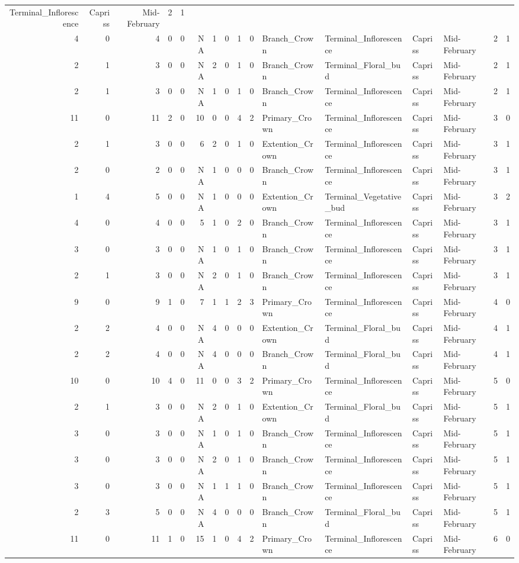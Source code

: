 \documentclass[]{article}
\begin{document}
\begin{longtable}[]{@{}rrrrrrrrrrllllrl@{}}
Terminal\_Inflorescence & Capriss & Mid-February & 2 & 1\tabularnewline
4 & 0 & 4 & 0 & 0 & NA & 1 & 0 & 1 & 0 & Branch\_Crown &
Terminal\_Inflorescence & Capriss & Mid-February & 2 & 1\tabularnewline
2 & 1 & 3 & 0 & 0 & NA & 2 & 0 & 1 & 0 & Branch\_Crown &
Terminal\_Floral\_bud & Capriss & Mid-February & 2 & 1\tabularnewline
2 & 1 & 3 & 0 & 0 & NA & 1 & 0 & 1 & 0 & Branch\_Crown &
Terminal\_Inflorescence & Capriss & Mid-February & 2 & 1\tabularnewline
11 & 0 & 11 & 2 & 0 & 10 & 0 & 0 & 4 & 2 & Primary\_Crown &
Terminal\_Inflorescence & Capriss & Mid-February & 3 & 0\tabularnewline
2 & 1 & 3 & 0 & 0 & 6 & 2 & 0 & 1 & 0 & Extention\_Crown &
Terminal\_Inflorescence & Capriss & Mid-February & 3 & 1\tabularnewline
2 & 0 & 2 & 0 & 0 & NA & 1 & 0 & 0 & 0 & Branch\_Crown &
Terminal\_Inflorescence & Capriss & Mid-February & 3 & 1\tabularnewline
1 & 4 & 5 & 0 & 0 & NA & 1 & 0 & 0 & 0 & Extention\_Crown &
Terminal\_Vegetative\_bud & Capriss & Mid-February & 3 &
2\tabularnewline
4 & 0 & 4 & 0 & 0 & 5 & 1 & 0 & 2 & 0 & Branch\_Crown &
Terminal\_Inflorescence & Capriss & Mid-February & 3 & 1\tabularnewline
3 & 0 & 3 & 0 & 0 & NA & 1 & 0 & 1 & 0 & Branch\_Crown &
Terminal\_Inflorescence & Capriss & Mid-February & 3 & 1\tabularnewline
2 & 1 & 3 & 0 & 0 & NA & 2 & 0 & 1 & 0 & Branch\_Crown &
Terminal\_Inflorescence & Capriss & Mid-February & 3 & 1\tabularnewline
9 & 0 & 9 & 1 & 0 & 7 & 1 & 1 & 2 & 3 & Primary\_Crown &
Terminal\_Inflorescence & Capriss & Mid-February & 4 & 0\tabularnewline
2 & 2 & 4 & 0 & 0 & NA & 4 & 0 & 0 & 0 & Extention\_Crown &
Terminal\_Floral\_bud & Capriss & Mid-February & 4 & 1\tabularnewline
2 & 2 & 4 & 0 & 0 & NA & 4 & 0 & 0 & 0 & Branch\_Crown &
Terminal\_Floral\_bud & Capriss & Mid-February & 4 & 1\tabularnewline
10 & 0 & 10 & 4 & 0 & 11 & 0 & 0 & 3 & 2 & Primary\_Crown &
Terminal\_Inflorescence & Capriss & Mid-February & 5 & 0\tabularnewline
2 & 1 & 3 & 0 & 0 & NA & 2 & 0 & 1 & 0 & Extention\_Crown &
Terminal\_Floral\_bud & Capriss & Mid-February & 5 & 1\tabularnewline
3 & 0 & 3 & 0 & 0 & NA & 1 & 0 & 1 & 0 & Branch\_Crown &
Terminal\_Inflorescence & Capriss & Mid-February & 5 & 1\tabularnewline
3 & 0 & 3 & 0 & 0 & NA & 2 & 0 & 1 & 0 & Branch\_Crown &
Terminal\_Inflorescence & Capriss & Mid-February & 5 & 1\tabularnewline
3 & 0 & 3 & 0 & 0 & NA & 1 & 1 & 1 & 0 & Branch\_Crown &
Terminal\_Inflorescence & Capriss & Mid-February & 5 & 1\tabularnewline
2 & 3 & 5 & 0 & 0 & NA & 4 & 0 & 0 & 0 & Branch\_Crown &
Terminal\_Floral\_bud & Capriss & Mid-February & 5 & 1\tabularnewline
11 & 0 & 11 & 1 & 0 & 15 & 1 & 0 & 4 & 2 & Primary\_Crown &
Terminal\_Inflorescence & Capriss & Mid-February & 6 & 0\tabularnewline

\end{longtable}
\end{document}
